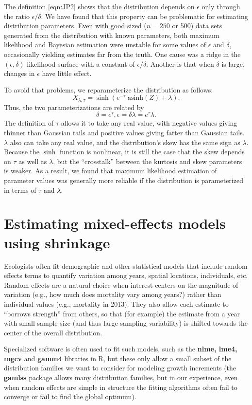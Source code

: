 \documentclass[12pt]{article}
\newcounter{box}
\newcommand{\be}{\begin{equation}}
\newcommand{\ee}{\end{equation}}
\begin{document}
The definition \eqref{eqn:JP2} shows that the distribution depends on $\epsilon$ only through the ratio $\epsilon/\delta$. We have found
that this property can be problematic for estimating distribution parameters. Even with good sized ($n=250$ or 500) data sets generated from the 
distribution with known parameters, both maximum likelihood and Bayesian estimation were unstable for some values of $\epsilon$ and $\delta$, 
occasionally yielding estimates far from the truth. One cause was a ridge in the $(\epsilon,\delta)$ likelihood surface with a constant of 
$\epsilon/\delta$. Another is that when $\delta$ is large,  changes in $\epsilon$ have little effect. 

To avoid that problems, we reparameterize the distribution as follows: 
\be
X_{\lambda,\tau} = \sinh \left( e^{-\tau} \; \mbox{asinh}(Z) + \lambda \right).
\label{eqn:SJP}
\ee
Thus, the two parameterizations are related by
\be
\delta = e^{\tau}, \epsilon= \delta \lambda =  e^{\tau} \lambda.
\ee
The definition of $\tau$ allows it to take any real value, with negative values giving thinner than Gaussian tails and positive
values giving fatter than Gaussian tails. $\lambda$ also can take any real value, and the distribution's skew has the same sign as $\lambda$. 
Because the $\sinh$ function is nonlinear, it is still the case that the skew depends on $\tau$ as well as $\lambda$, but the
``crosstalk'' between the kurtosis and skew parameters is weaker. As  a result, we found that maximum likelihood estimation of parameter values was 
generally more reliable if the distribution is parameterized in terms of $\tau$ and $\lambda$. 

\section{Estimating mixed-effects models using shrinkage}

Ecologists often fit demographic and other statistical models that include random effects terms to
quantify variation among years, spatial locations, individuals, etc. Random effects
are a natural choice when interest centers on the magnitude of variation (e.g., how much does mortality vary among years?)  
rather than individual values (e.g., mortality in 2013). They also allow each estimate to 
``borrows strength'' from others, so that (for example) the estimate from a year with small sample size (and thus large 
sampling variability) is shifted towards the center of the overall distribution. 

Specialized software is often used to fit such models, such as the \textbf{nlme, lme4, mgcv} and \textbf{gamm4} libraries in R,  
but these only allow a small subset of the distribution families we want to consider for modeling growth increments (the \textbf{gamlss} 
package allows many distribution families, but in our experience, even when random effects are simple in structure 
the fitting algorithms often fail to converge or fail to find the global optimum). 
\end{document}
